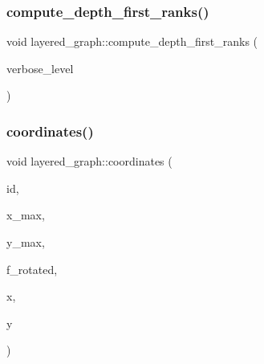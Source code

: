 \subsubsection{\texorpdfstring{compute\+\_\+depth\+\_\+first\+\_\+ranks()}{compute\_depth\_first\_ranks()}}
{\footnotesize\ttfamily void layered\+\_\+graph\+::compute\+\_\+depth\+\_\+first\+\_\+ranks (\begin{DoxyParamCaption}\item[{\mbox{\hyperlink{galois_8h_a09fddde158a3a20bd2dcadb609de11dc}{I\+NT}}}]{verbose\+\_\+level }\end{DoxyParamCaption})}

\mbox{\label{classlayered__graph_abbe593a1640471038ad4d5264416e19c}} 
\subsubsection{\texorpdfstring{coordinates()}{coordinates()}}
{\footnotesize\ttfamily void layered\+\_\+graph\+::coordinates (\begin{DoxyParamCaption}\item[{\mbox{\hyperlink{galois_8h_a09fddde158a3a20bd2dcadb609de11dc}{I\+NT}}}]{id,  }\item[{\mbox{\hyperlink{galois_8h_a09fddde158a3a20bd2dcadb609de11dc}{I\+NT}}}]{x\+\_\+max,  }\item[{\mbox{\hyperlink{galois_8h_a09fddde158a3a20bd2dcadb609de11dc}{I\+NT}}}]{y\+\_\+max,  }\item[{\mbox{\hyperlink{galois_8h_a09fddde158a3a20bd2dcadb609de11dc}{I\+NT}}}]{f\+\_\+rotated,  }\item[{\mbox{\hyperlink{galois_8h_a09fddde158a3a20bd2dcadb609de11dc}{I\+NT}} \&}]{x,  }\item[{\mbox{\hyperlink{galois_8h_a09fddde158a3a20bd2dcadb609de11dc}{I\+NT}} \&}]{y }\end{DoxyParamCaption})}

\mbox{\label{classlayered__graph_a6941694e288f9fd022ccc54b04a77f5f}} 
